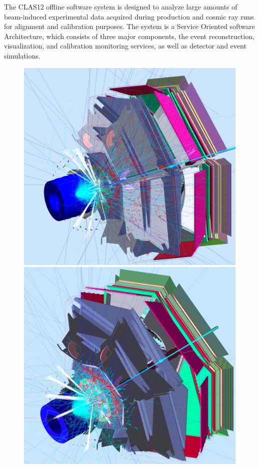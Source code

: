 \documentclass[final,3p,twocolumn]{elsarticle}
\begin{document}
The CLAS12 offline software system is designed to analyze large amounts of beam-induced experimental data acquired
during production and cosmic ray runs for alignment and calibration purposes. The system is a Service Oriented software
Architecture, which consists of three major components, the event reconstruction, visualization, and calibration
monitoring services, as well as detector and event simulations.  

\begin{figure}[htbp!]
\centerline{\includegraphics[width=1.0\columnwidth]{50percentNoSolenoidNoTorus1.png}
\includegraphics[width=1.0\columnwidth]{50percentNoSolenoid2a.png}}

\end{figure}
\end{document}
